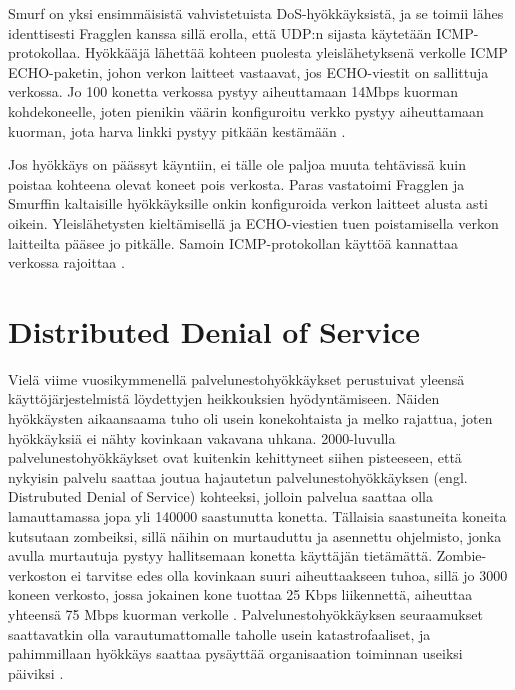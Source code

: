 Smurf on yksi ensimmäisistä vahvistetuista DoS-hyökkäyksistä, ja se
toimii lähes identtisesti Fragglen kanssa sillä erolla, että UDP:n
sijasta käytetään ICMP-pro\-to\-kol\-laa. Hyökkääjä lähettää kohteen
puolesta yleislähetyksenä verkolle ICMP ECHO-paketin, johon verkon
laitteet vastaavat, jos ECHO-viestit on sallittuja verkossa. Jo 100
konetta verkossa pystyy aiheuttamaan 14Mbps kuorman kohdekoneelle,
joten pienikin väärin konfiguroitu verkko pystyy aiheuttamaan kuorman,
jota harva linkki pystyy pitkään kestämään \cite{Hacking}.

Jos hyökkäys on päässyt käyntiin, ei tälle ole paljoa muuta tehtävissä
kuin poistaa kohteena olevat koneet pois verkosta. Paras vastatoimi
Fragglen ja Smurffin kaltaisille hyökkäyksille onkin konfiguroida
verkon laitteet alusta asti oikein. Yleislähetysten kieltämisellä ja
ECHO-viestien tuen poistamisella verkon laitteilta pääsee jo
pitkälle. Samoin ICMP-protokollan käyttöä kannattaa verkossa rajoittaa
\cite{Hacking}.

\section{Distributed Denial of Service}

Vielä viime vuosikymmenellä palvelunestohyökkäykset perustuivat yleensä
käyttöjärjestelmistä löydettyjen heikkouksien hyödyntämiseen. Näiden
hyökkäysten aikaansaama tuho oli usein konekohtaista ja melko rajattua, joten
hyökkäyksiä ei nähty kovinkaan vakavana uhkana. 2000-luvulla
palvelunestohyökkäykset ovat kuitenkin kehittyneet siihen pisteeseen, että
nykyisin palvelu saattaa joutua hajautetun palvelunestohyökkäyksen (engl.
Distrubuted Denial of Service) kohteeksi, jolloin palvelua saattaa olla
lamauttamassa jopa yli 140000 saastunutta konetta. Tällaisia saastuneita
koneita kutsutaan zombeiksi, sillä näihin on murtauduttu ja asennettu
ohjelmisto, jonka avulla murtautuja pystyy hallitsemaan konetta käyttäjän
tietämättä. Zombie-verkoston ei tarvitse edes olla kovinkaan suuri
aiheuttaakseen tuhoa, sillä jo 3000 koneen verkosto, jossa jokainen kone
tuottaa 25 Kbps liikennettä, aiheuttaa yhteensä 75 Mbps kuorman verkolle \cite{Hacking}.
Palvelunestohyökkäyksen seuraamukset saattavatkin olla varautumattomalle
taholle usein katastrofaaliset, ja pahimmillaan hyökkäys saattaa pysäyttää
organisaation toiminnan useiksi päiviksi \cite{CERT}.

